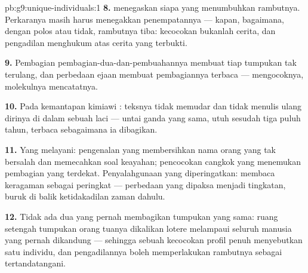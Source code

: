 \begin{solution}{pb:g9:unique-individuals:1}
\textbf{8.}  menegaskan  siapa yang menumbuhkan
rambutnya. Perkaranya masih harus menegakkan penempatannya
--- kapan, bagaimana, dengan polos atau tidak, rambutnya
tiba: kecocokan bukanlah cerita, dan pengadilan menghukum
atas cerita yang terbukti.

\textbf{9.} Pembagian pembagian-dua-dan-pembuahannya membuat
tiap tumpukan tak terulang, dan perbedaan ejaan  membuat
pembagiannya terbaca ---  mengocoknya, molekulnya
mencatatnya.

\textbf{10.} Pada kemantapan kimiawi : teksnya tidak
memudar dan tidak menulis ulang dirinya di dalam sebuah laci
--- untai ganda yang sama, utuh sesudah tiga puluh tahun,
terbaca sebagaimana ia dibagikan.

\textbf{11.} Yang melayani: pengenalan yang membersihkan
nama orang yang tak bersalah dan memecahkan soal keayahan;
pencocokan cangkok yang menemukan pembagian yang terdekat.
Penyalahgunaan yang diperingatkan: membaca keragaman
 sebagai peringkat --- perbedaan yang dipaksa
menjadi tingkatan,  buruk di balik ketidakadilan
zaman dahulu.

\textbf{12.} Tidak ada dua  yang pernah membagikan
tumpukan yang sama: ruang setengah tumpukan orang tuanya
dikalikan lotere  melampaui seluruh manusia yang
pernah dikandung --- sehingga sebuah kecocokan profil penuh
menyebutkan satu individu, dan pengadilannya boleh
memperlakukan rambutnya sebagai tertandatangani.
\end{solution}
